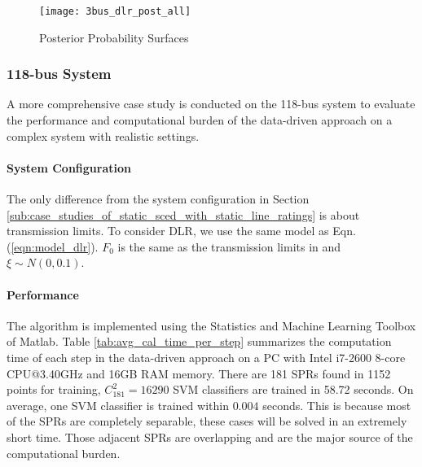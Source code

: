 \documentclass[letterpaper, 11pt]{article}
\theoremstyle{plain}
\theoremstyle{definition}
\begin{document}
\begin{figure}[htbp]
  \centering
  \texttt{[image: 3bus\_dlr\_post\_all]} 
  \caption{Posterior Probability Surfaces}
  \label{fig:3bus_dlr_post_all} 
\end{figure}








\subsubsection{118-bus System} \label{ssub:118_bus_system_dlr}
A more comprehensive case study is conducted on the 118-bus system to evaluate the performance and computational burden of the data-driven approach on a complex system with realistic settings.


\paragraph{System Configuration} \label{par:system_configuration}
The only difference from the system configuration in Section \ref{sub:case_studies_of_static_sced_with_static_line_ratings} is about transmission limits. To consider DLR, we use the same model as Eqn. (\ref{eqn:model_dlr}). $F_0$ is the same as the transmission limits in \cite{Technology} and $\xi \sim N(0,0.1)$.











\paragraph{Performance} \label{par:classification_accuracy}
The algorithm is implemented using the Statistics and Machine Learning Toolbox of Matlab.
Table \ref{tab:avg_cal_time_per_step} summarizes the computation time of each step in the data-driven approach on a PC with Intel i7-2600 8-core CPU@3.40GHz and 16GB RAM memory. There are 181 SPRs found in 1152 points for training, $C_{181}^2 = 16290$ SVM classifiers are trained in 58.72 seconds. On average, one SVM classifier is trained within $0.004$ seconds. This is because most of the SPRs are completely separable, these cases will be solved in an extremely short time. Those adjacent SPRs are overlapping and are the major source of the computational burden.
\end{document}
